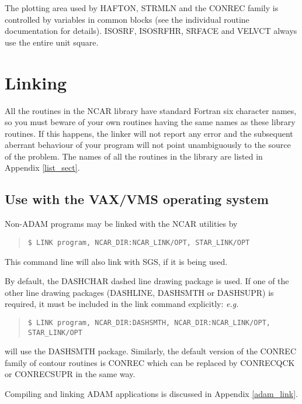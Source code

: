 The plotting area used by HAFTON, STRMLN and the CONREC family is controlled
by variables in common blocks (see the individual routine documentation for
details).
ISOSRF, ISOSRFHR, SRFACE and VELVCT always use the entire unit
square.


\section{Linking}

All the routines in the NCAR library have standard Fortran six character
names, so you must beware of your own routines having the same names as these
library routines.
If this happens, the linker will not report any error and
the subsequent aberrant behaviour of your program will not point
unambiguously to the source of the problem.
The names of all the routines
in the library are listed in Appendix \ref{list_sect}.


\subsection{Use with the VAX/VMS operating system}

Non-ADAM programs may be linked with the NCAR utilities by

\begin{quote}
\begin{verbatim}
$ LINK program, NCAR_DIR:NCAR_LINK/OPT, STAR_LINK/OPT
\end{verbatim}
\end{quote}

This command line will also link with SGS, if it is being used.

By default, the DASHCHAR dashed line drawing package is used. 
If one of the other line drawing packages (DASHLINE, DASHSMTH or DASHSUPR) 
is required, it must be included in the link command explicitly: {\em e.g.}

\begin{quote}
\begin{verbatim}
$ LINK program, NCAR_DIR:DASHSMTH, NCAR_DIR:NCAR_LINK/OPT, STAR_LINK/OPT
\end{verbatim}
\end{quote}

will use the DASHSMTH package.
Similarly, the default version of the CONREC family of contour routines is
CONREC which can be replaced by CONRECQCK or CONRECSUPR in the same way.

Compiling and linking ADAM applications is discussed in Appendix
\ref{adam_link}.


